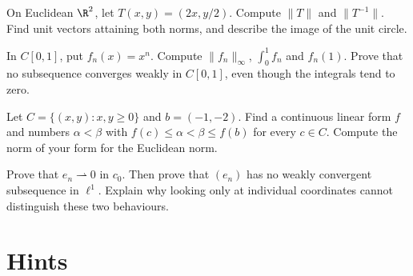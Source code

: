 \begin{exercise}[$\star$]\label{ex:v8c01a}
On Euclidean $\R^2$, let $T(x,y)=(2x,y/2)$. Compute $\|T\|$ and $\|T^{-1}\|$. Find unit vectors attaining both norms, and describe the image of the unit circle.
\end{exercise}
\begin{exercise}[$\star\star$]\label{ex:v8c01b}
In $C[0,1]$, put $f_n(x)=x^n$. Compute $\|f_n\|_\infty$, $\int_0^1f_n$ and $f_n(1)$. Prove that no subsequence converges weakly in $C[0,1]$, even though the integrals tend to zero.
\end{exercise}
\begin{exercise}[$\star$]\label{ex:v8c01c}
Let $C=\{(x,y):x,y\ge0\}$ and $b=(-1,-2)$. Find a continuous linear form $f$ and numbers $\alpha<\beta$ with $f(c)\le\alpha<\beta\le f(b)$ for every $c\in C$. Compute the norm of your form for the Euclidean norm.
\end{exercise}
\begin{exercise}[$\star\star$]\label{ex:v8c01d}
Prove that $e_n\rightharpoonup0$ in $c_0$. Then prove that $(e_n)$ has no weakly convergent subsequence in $\ell^1$. Explain why looking only at individual coordinates cannot distinguish these two behaviours.
\end{exercise}

\section{Hints}

